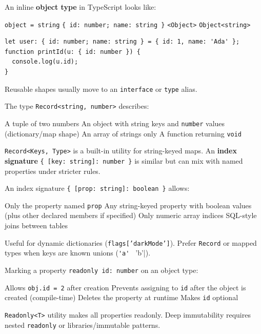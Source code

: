 \question[4]
An inline \textbf{object type} in TypeScript looks like:
\begin{choices}
  \choice \lstinline[style=tsinline]|object = string|
  \CorrectChoice \lstinline[style=tsinline]|{ id: number; name: string }|
  \choice \lstinline[style=tsinline]|<Object>|
  \choice \lstinline[style=tsinline]|Object<string>|
\end{choices}
\begin{solution}
\begin{lstlisting}[style=ts]
let user: { id: number; name: string } = { id: 1, name: 'Ada' };
function printId(u: { id: number }) {
  console.log(u.id);
}
\end{lstlisting}
  Reusable shapes usually move to an \lstinline[style=tsinline]|interface| or \lstinline[style=tsinline]|type| alias.
\end{solution}

\question[4]
The type \lstinline[style=tsinline]|Record<string, number>| describes:
\begin{choices}
  \choice A tuple of two numbers
  \CorrectChoice An object with string keys and \lstinline[style=tsinline]|number| values (dictionary/map shape)
  \choice An array of strings only
  \choice A function returning \lstinline[style=tsinline]|void|
\end{choices}
\begin{solution}
  \lstinline[style=tsinline]|Record<Keys, Type>| is a built-in utility for string-keyed maps. An \textbf{index signature} \lstinline[style=tsinline]|{ [key: string]: number }| is similar but can mix with named properties under stricter rules.
\end{solution}

\question[4]
An index signature \lstinline[style=tsinline]|{ [prop: string]: boolean }| allows:
\begin{choices}
  \choice Only the property named \texttt{prop}
  \CorrectChoice Any string-keyed property with boolean values (plus other declared members if specified)
  \choice Only numeric array indices
  \choice SQL-style joins between tables
\end{choices}
\begin{solution}
  Useful for dynamic dictionaries (\texttt{flags['darkMode']}). Prefer \lstinline[style=tsinline]|Record| or mapped types when keys are known unions (\lstinline[style=tsinline]|'a' | 'b'|).
\end{solution}

\question[4]
Marking a property \lstinline[style=tsinline]|readonly id: number| on an object type:
\begin{choices}
  \choice Allows \lstinline[style=tsinline]|obj.id = 2| after creation
  \CorrectChoice Prevents assigning to \lstinline[style=tsinline]|id| after the object is created (compile-time)
  \choice Deletes the property at runtime
  \choice Makes \lstinline[style=tsinline]|id| optional
\end{choices}
\begin{solution}
  \lstinline[style=tsinline]|Readonly<T>| utility makes all properties readonly. Deep immutability requires nested \lstinline[style=tsinline]|readonly| or libraries/immutable patterns.
\end{solution}

